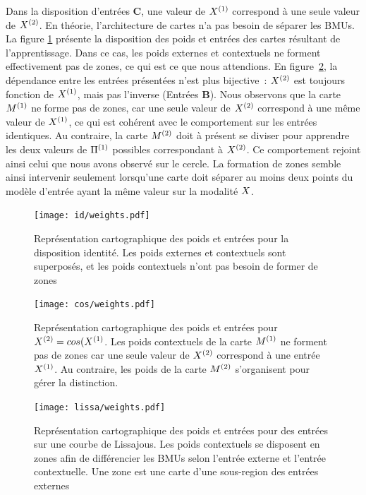 \documentclass[../main]{subfiles}
\begin{document}
Dans la disposition d'entrées \textbf{C}, une valeur de $X^{({1})}$ correspond à une seule valeur de $X^{({2})}$. En théorie, l'architecture de cartes n'a pas besoin de séparer les BMUs. 
La figure \ref{fig:id_results} présente la disposition des poids et entrées des cartes résultant de l'apprentissage. Dans ce cas, les poids externes et contextuels ne forment effectivement pas de zones, ce qui est ce que nous attendions.
En figure~\ref{fig:cos_results}, la dépendance entre les entrées présentées n'est plus bijective~: $X^{({2})}$ est toujours fonction de $X^{({1})}$, mais pas l'inverse (Entrées \textbf{B}). 
Nous observons que la carte $M^{({1})}$ ne forme pas de zones, car une seule valeur de $X^{({2})}$ correspond à une même valeur de $X^{({1})}$, ce qui est cohérent avec le comportement sur les entrées identiques.
Au contraire, la carte $M^{({2})}$ doit à présent se diviser pour apprendre les deux valeurs de $\Pi^{({1})}$ possibles correspondant à $X^{({2})}$. Ce comportement rejoint ainsi celui que nous avons observé sur le cercle.
La formation de zones semble ainsi intervenir seulement lorsqu'une carte doit séparer au moins deux points du modèle d'entrée ayant la même valeur sur la modalité $X$.

\begin{figure}[H]
	\centering\texttt{[image: id/weights.pdf]}
	\vspace{-0.3cm}
	\caption{Représentation cartographique des poids et entrées pour la disposition identité. Les poids externes et contextuels sont superposés, et les poids contextuels n'ont pas besoin de former de zones \label{fig:id_results}}
\end{figure}
\begin{figure}[H]
	\centering\texttt{[image: cos/weights.pdf]}
	\vspace{-0.3cm}
	\caption{Représentation cartographique des poids et entrées pour $X^{({2})} = cos(X^{({1})}$. Les poids contextuels de la carte $M^{({1})}$ ne forment pas de zones car une seule valeur de $X^{({2})}$ correspond à une entrée $X^{({1})}$. Au contraire, les poids de la carte $M^{({2})}$ s'organisent pour gérer la distinction. \label{fig:cos_results}}
\end{figure}
\begin{figure}[H]
	\centering\texttt{[image: lissa/weights.pdf]}
	\vspace{-0.3cm}
	\caption{Représentation cartographique des poids et entrées pour des entrées sur une courbe de Lissajous. Les poids contextuels se disposent en zones afin de différencier les BMUs selon l'entrée externe et l'entrée contextuelle. Une zone est une carte d'une sous-region des entrées externes \label{fig:lissa}}
\end{figure}
\end{document}
